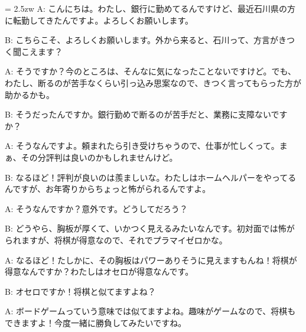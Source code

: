 \documentclass[11pt]{amsart}
\title{}
\author{}
\newenvironment{hangall}[1]{\hangindent = 2.5zw\everypar{\hangindent = 2.5zw}}{}
\begin{document}
\maketitle
\begin{hangall}{}%
A: こんにちは。わたし、銀行に勤めてるんですけど、最近石川県の方に転勤してきたんですよ。よろしくお願いします。

B: こちらこそ、よろしくお願いします。外から来ると、石川って、方言がきつく聞こえます？

A: そうですか？今のところは、そんなに気になったことないですけど。でも、わたし、断るのが苦手なくらい引っ込み思案なので、きつく言ってもらった方が助かるかも。

B: そうだったんですか。銀行勤めで断るのが苦手だと、業務に支障ないですか？

A: そうなんですよ。頼まれたら引き受けちゃうので、仕事が忙しくって。まぁ、その分評判は良いのかもしれませんけど。

B: なるほど！評判が良いのは羨ましいな。わたしはホームヘルパーをやってるんですが、お年寄りからちょっと怖がられるんですよ。

A: そうなんですか？意外です。どうしてだろう？

B: どうやら、胸板が厚くて、いかつく見えるみたいなんです。初対面では怖がられますが、将棋が得意なので、それでプラマイゼロかな。

A: なるほど！たしかに、その胸板はパワーありそうに見えますもんね！将棋が得意なんですか？わたしはオセロが得意なんです。

B: オセロですか！将棋と似てますよね？

A: ボードゲームっていう意味では似てますよね。趣味がゲームなので、将棋もできますよ！今度一緒に勝負してみたいですね。
\end{hangall}
\end{document}
